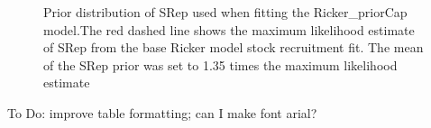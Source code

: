 \documentclass[11pt]{book}
\begin{document}
\clearpage

\label{app:coho-appendix}
\begin{figure}[htb]

{\centering {} 

}

\caption{Prior distribution of SRep used when fitting the Ricker\_priorCap model.The red dashed line shows the maximum likelihood estimate of SRep from the base Ricker model stock recruitment fit. The mean of the SRep prior was set to 1.35 times the maximum likelihood estimate}\label{fig:coho-SrepPrior}
\end{figure}
To Do: improve table formatting; can I make font arial?
\end{document}
